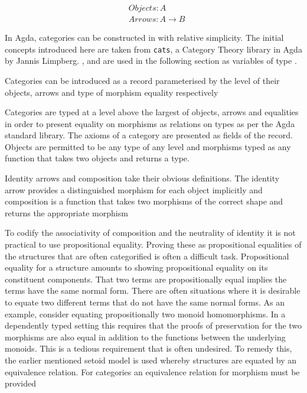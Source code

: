 \begin{align*}
    &Objects : A \\
    &Arrows : A \rightarrow B
\end{align*}

In Agda, categories can be constructed in with relative simplicity. The initial
concepts introduced here are taken from \verb|cats|, a Category Theory library
in Agda by Jannis Limpberg. ,  and 
are used in the following section as variables of type .

Categories can be introduced as a record parameterised by the level of their
objects, arrows and type of morphism equality respectively


Categories are typed at a level above the largest of objects, arrows and
equalities in order to present equality on morphisms as relations on types as
per the Agda standard library. The axioms of a category are presented as fields
of the record. Objects are permitted to be any type of any level and morphisms
typed as any function that takes two objects and returns a type.

Identity arrows and composition take their obvious definitions. The identity
arrow provides a distinguished morphism for each object implicitly and
composition is a function that takes two morphisms of the correct shape and
returns the appropriate morphism

To codify the associativity of composition and the neutrality of identity it is
not practical to use propositional equality. Proving these as propositional
equalities of the structures that are often categorified is often a difficult
task. Propositional equality for a structure amounts to showing propositional
equality on its constituent components. That two terms are propositionally equal
implies the terms have the same normal form. There are often situations where it
is desirable to equate two different terms that do not have the same normal
forms. As an example, consider equating propositionally two monoid
homomorphisms. In a dependently typed setting this requires that the proofs of
preservation for the two morphisms are also equal in addition to the functions
between the underlying monoids. This is a tedious requirement that is often
undesired. To remedy this, the earlier mentioned setoid model is
used whereby structures are equated by an equivalence relation. For
categories an equivalence relation for morphism must be provided

